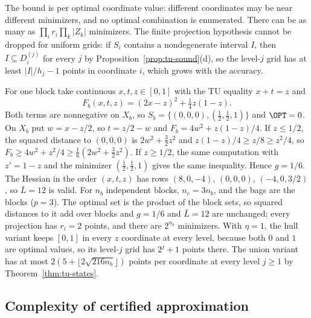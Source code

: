 The bound is per optimal coordinate value: different coordinates may be
near different minimizers, and no optimal combination is enumerated. There
can be as many as $\prod_ir_i\prod_k\lvert Z_k\rvert$ minimizers. The finite
projection hypothesis cannot be dropped for uniform grids: if $S_i$ contains a
nondegenerate interval $I$, then $I\subseteq D^{(j)}_i$ for every $j$ by
Proposition~\ref{prop:tu-sound}(d), so the level-$j$ grid has at least
$\lvert I\rvert/h_j-1$ points in coordinate $i$, which grows with the accuracy.

\begin{example}\label{ex:tu-union}
For one block take continuous $x,t,z\in[0,1]$ with the TU equality $x+t=z$
and
\[
F_b(x,t,z)=(2x-z)^2+\tfrac14z(1-z).
\]
Both terms are nonnegative on $X_b$, so $S_b=\{(0,0,0),(\tfrac12,\tfrac12,1)\}$
and $\OPT=0$. On $X_b$ put $w=x-z/2$, so $t=z/2-w$ and
$F_b=4w^2+z(1-z)/4$. If $z\le1/2$, the squared distance to $(0,0,0)$ is
$2w^2+\frac32z^2$ and $z(1-z)/4\ge z/8\ge z^2/4$, so
$F_b\ge4w^2+z^2/4\ge\frac16(2w^2+\frac32z^2)$. If $z\ge1/2$, the same
computation with $z'=1-z$ and the minimizer $(\frac12,\frac12,1)$ gives the
same inequality. Hence $g=1/6$. The Hessian in the order $(x,t,z)$ has rows
$(8,0,-4)$, $(0,0,0)$, $(-4,0,3/2)$, so $\bar L=12$ is valid. For $n_b$
independent blocks, $n_c=3n_b$, and the bags are the blocks ($p=3$). The
optimal set is the product of the block sets, so squared distances to it add
over blocks and $g=1/6$ and $\bar L=12$ are unchanged; every projection has
$r_i=2$ points, and there are $2^{n_b}$ minimizers. With $\eta=1$, the hull variant keeps $[0,1]$ in every $z$
coordinate at every level, because both $0$ and $1$ are optimal values, so
its level-$j$ grid has $2^j+1$ points there. The union variant has at most
$2(5+\lfloor2\sqrt{216n_b}\rfloor)$ points per coordinate at every level
$j\ge1$ by Theorem~\ref{thm:tu-states}.
\end{example}

\subsection{Complexity of certified approximation}\label{sec:tu-complexity}

